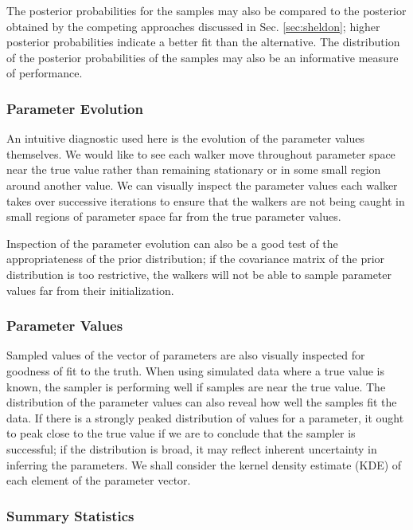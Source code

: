 \documentclass[preprint]{aastex}
\begin{document}
The posterior probabilities for the samples may also be compared to the 
posterior obtained by the competing approaches discussed in Sec. 
\ref{sec:sheldon}; higher posterior probabilities indicate a better fit than 
the alternative.  The distribution of the posterior probabilities of the 
samples may also be an informative measure of performance.

\clearpage
\subsubsection{Parameter Evolution}
\label{sec:params}

An intuitive diagnostic used here is the evolution of the parameter values 
themselves.  We would like to see each walker move throughout parameter space 
near the true value rather than remaining stationary or in some small region 
around another value.  We can visually inspect the parameter values each walker 
takes over successive iterations to ensure that the walkers are not being 
caught in small regions of parameter space far from the true parameter values.  

Inspection of the parameter evolution can also be a good test of the 
appropriateness of the prior distribution; if the covariance matrix of the 
prior distribution is too restrictive, the walkers will not be able to sample 
parameter values far from their initialization.  

\clearpage
\subsubsection{Parameter Values}
\label{sec:samps}

Sampled values of the vector of parameters are also visually inspected for 
goodness of fit to the truth.  When using simulated data where a true value is 
known, the sampler is performing well if samples are near the true value.  The 
distribution of the parameter values can also reveal how well the samples fit 
the data.  If there is a strongly peaked distribution of values for a 
parameter, it ought to peak close to the true value if we are to conclude that 
the sampler is successful; if the distribution is broad, it may reflect 
inherent uncertainty in inferring the parameters.  We shall consider the kernel 
density estimate (KDE) of each element of the parameter vector.

\clearpage
\subsubsection{Summary Statistics}
\label{sec:stats}
\end{document}
